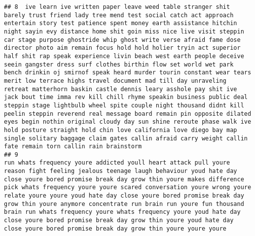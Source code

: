 \documentclass[]{article}
\begin{document}
\begin{verbatim}
## 8  ive learn ive written paper leave weed table stranger shit barely trust friend lady tree mend test social catch act approach entertain story test patience spent money earth assistance hitchin night sayin evy distance home shit goin miss nice live visit steppin car stage purpose ghostride whip ghost write verse afraid fame dose director photo aim remain focus hold hold holier tryin act superior half shit rap speak experience livin beach west earth people deceive seein gangster dress surf clothes birthin flow set world wet park bench drinkin oj smirnof speak heard murder tourin constant wear tears merit low terrace highs travel document mad till day unraveling retreat matterhorn baskin castle dennis leary asshole pay shit ive jack bout time imma rev kill chill rhyme speakin business public deal steppin stage lightbulb wheel spite couple night thousand didnt kill peelin steppin reverend real message board remain pin opposite dilated eyes begin nothin original cloudy day sun shine reroute phase walk ive hold posture straight hold chin love california love diego bay map single solitary baggage claim gates callin afraid carry weight callin fate remain torn callin rain brainstorm
## 9                                                                                                                                                                                                                                                                                                                                                                                                                                                                                                                                                                                                          run whats frequency youre addicted youll heart attack pull youre reason fight feeling jealous teenage laugh behaviour youd hate day close youre bored promise break day grow thin youre makes difference pick whats frequency youre youre scared conversation youre wrong youre relate youre youre youd hate day close youre bored promise break day grow thin youre anymore concentrate run brain run youre fun thousand brain run whats frequency youre whats frequency youre youd hate day close youre bored promise break day grow thin youre youd hate day close youre bored promise break day grow thin youre youre youre

\end{verbatim}
\end{document}

